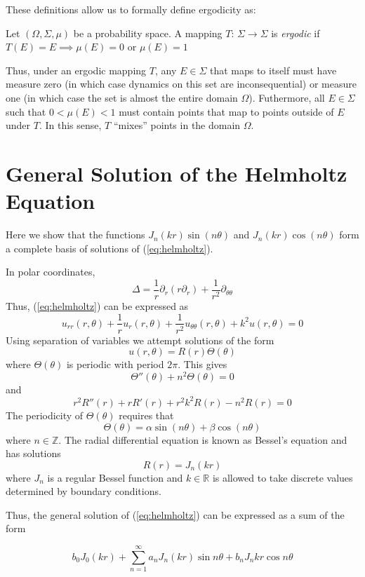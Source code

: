 \documentclass{report}
\begin{document}
These definitions allow us to formally define ergodicity as:

\begin{dfn}[Ergodicity]
Let $(\Omega, \Sigma, \mu)$ be a probability space. A mapping $T$: $\Sigma \rightarrow \Sigma$ is \emph{ergodic} if $T(E) = E \implies \mu(E) = 0$ or $\mu(E) = 1$
\end{dfn}

Thus, under an ergodic mapping $T$, any $E \in \Sigma$ that maps to itself must have measure zero (in which case dynamics on this set are inconsequential) or measure one (in which case the set is almost the entire domain $\Omega$). Futhermore, all $E \in \Sigma$ such that $0 < \mu(E) < 1$ must contain points that map to points outside of $E$ under $T$. In this sense, $T$ ``mixes'' points in the domain $\Omega$.

\chapter{General Solution of the Helmholtz Equation}
\label{sec:helmholtz_basis}
Here we show that the functions $J_{n}(k r) \sin(n \theta)$ and $J_{n}(k r) \cos(n \theta)$ form a complete basis of solutions of (\ref{eq:helmholtz}).

In polar coordinates,
\[
\Delta = \frac{1}{r} \partial_{r} (r \partial_{r}) + \frac{1}{r^{2}} \partial_{\theta \theta}
\]
Thus, (\ref{eq:helmholtz}) can be expressed as
\[
u_{rr}(r, \theta) + \frac{1}{r} u_{r}(r, \theta) + \frac{1}{r^{2}} u_{\theta \theta}(r, \theta) + k^2 u(r, \theta) = 0
\]
Using separation of variables we attempt solutions of the form
\[
u(r, \theta) = R(r) \Theta(\theta)
\]
where $\Theta(\theta)$ is periodic with period $2 \pi$. This gives
\[
\Theta''(\theta) + n^{2} \Theta(\theta) = 0
\]
and
\[
r^{2} R''(r) + r R'(r) + r^{2} k^{2} R(r) - n^{2} R(r) = 0
\]
The periodicity of $\Theta(\theta)$ requires that
\[
\Theta(\theta) = \alpha \sin(n \theta) + \beta \cos(n \theta)
\]
where $n \in \mathbb{Z}$.
The radial differential equation is known as Bessel's equation and has solutions
\[
R(r) = J_{n}(k r)
\]
where $J_{n}$ is a regular Bessel function and $k \in \mathbb{R}$ is allowed to take discrete values determined by boundary conditions.

Thus, the general solution of (\ref{eq:helmholtz}) can be expressed as a sum of the form

\begin{equation}
  \label{eq:helmholtz_gen_soln}
  b_{0} J_{0}(kr) + \sum_{n = 1}^{\infty}{a_{n} J_n(kr) \sin{n \theta} + b_{n} J_n{kr} \cos{n \theta}}
\end{equation}
\end{document}
